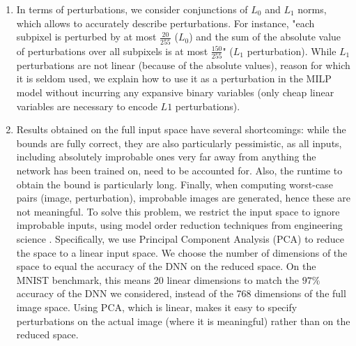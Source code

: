 \begin{enumerate}
   \item  In terms of perturbations, we consider conjunctions of $L_0$ and $L_1$ norms, which allows to accurately describe perturbations. For instance, "each subpixel is perturbed by at most $\frac{20}{255}$ ($L_0$) and the sum of the absolute value of perturbations over all subpixels is at most $\frac{150}{255}$" ($L_1$ perturbation). While $L_1$ perturbations are not linear (because of the absolute values), reason for which it is seldom used, we explain how to use it as a perturbation in the MILP model without incurring any expansive binary variables (only cheap linear variables are necessary to encode $L1$ perturbations).

	\item Results obtained on the full input space have several shortcomings: while the bounds are fully correct, they are also particularly pessimistic, as all inputs, including absolutely improbable ones very far away from anything the network has been trained on, need to be accounted for. Also, the runtime to obtain the bound is particularly long. Finally, when computing worst-case 
	pairs (image, perturbation), improbable images are generated, hence these  are not meaningful. To solve this problem, we restrict the input space to ignore improbable inputs, using model order reduction techniques from engineering science \cite{aiware}. Specifically, we use Principal Component Analysis (PCA) to reduce the space to a linear input space. We choose the number of dimensions of the space to equal the accuracy of the DNN on the reduced space. 
	On the MNIST benchmark, this means 20 linear dimensions to match the $97\%$ accuracy of the DNN we considered, instead of the 768 dimensions of the full image space. Using PCA, which is linear, makes it easy to specify perturbations on the actual image (where it is meaningful) rather than on the reduced space.


\end{enumerate}
